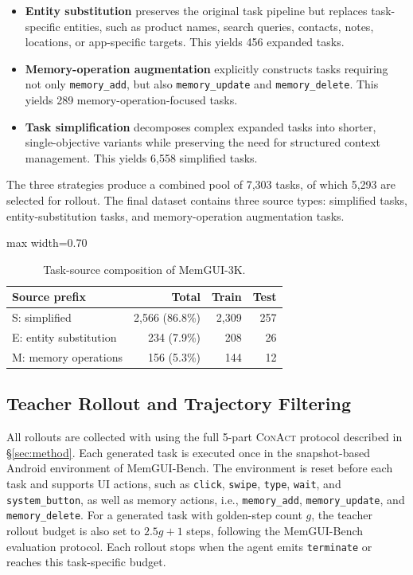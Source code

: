 \documentclass{llmxive}
\providecommand{\memaction}[1]{\texttt{#1}}
\providecommand{\llmname}[1]{{\fontfamily{pcr}\selectfont{#1}}}
\providecommand{\conact}{\textsc{ConAct}\xspace}
\begin{document}
\begin{itemize}
    \item \textbf{Entity substitution} preserves the original task pipeline but replaces task-specific entities, such as product names, search queries, contacts, notes, locations, or app-specific targets. This yields 456 expanded tasks.
    \item \textbf{Memory-operation augmentation} explicitly constructs tasks requiring not only \memaction{memory\_add}, but also \memaction{memory\_update} and \memaction{memory\_delete}. This yields 289 memory-operation-focused tasks.
    \item \textbf{Task simplification} decomposes complex expanded tasks into shorter, single-objective variants while preserving the need for structured context management. This yields 6{,}558 simplified tasks.
\end{itemize}

The three strategies produce a combined pool of 7{,}303 tasks, of which 5{,}293 are selected for rollout. The final dataset contains three source types: simplified tasks, entity-substitution tasks, and memory-operation augmentation tasks.

\begin{table}[!htbp]
\centering
\footnotesize
\begin{adjustbox}{max width=0.70\linewidth}
\begin{tabular}{lrrr}
\toprule
Source prefix & Total & Train & Test \\
\midrule
S: simplified & 2{,}566 (86.8\%) & 2{,}309 & 257 \\
E: entity substitution & 234 (7.9\%) & 208 & 26 \\
M: memory operations & 156 (5.3\%) & 144 & 12 \\
\bottomrule
\end{tabular}
\end{adjustbox}
\caption{Task-source composition of MemGUI-3K.}
\label{tab:appendix-prefix}
\end{table}

\subsection{Teacher Rollout and Trajectory Filtering}
\label{sec:appendix-rollout-filtering}

All rollouts are collected with \llmname{Qwen3-VL-235B-Thinking} using the full 5-part \conact protocol described in \S\ref{sec:method}. Each generated task is executed once in the snapshot-based Android environment of MemGUI-Bench. The environment is reset before each task and supports UI actions, such as \texttt{click}, \texttt{swipe}, \texttt{type}, \texttt{wait}, and \texttt{system\_button}, as well as memory actions, i.e., \memaction{memory\_add}, \memaction{memory\_update}, and \memaction{memory\_delete}. For a generated task with golden-step count $g$, the teacher rollout budget is also set to $2.5g+1$ steps, following the MemGUI-Bench evaluation protocol. Each rollout stops when the agent emits \texttt{terminate} or reaches this task-specific budget.
\end{document}
